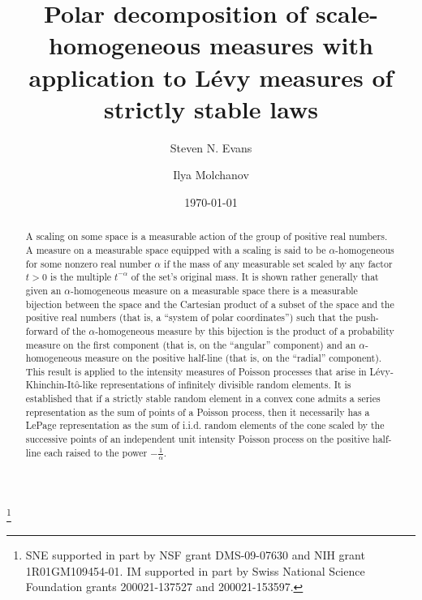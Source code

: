 \documentclass[12pt]{amsart}
\numberwithin{equation}{section}
\numberwithin{figure}{section}
\theoremstyle{plain} \newtheorem{theorem}{Theorem}[section]
\theoremstyle{plain} \newtheorem{proposition}[theorem]{Proposition}
\theoremstyle{plain} \newtheorem{lemma}[theorem]{Lemma}
\theoremstyle{plain} \newtheorem{corollary}[theorem]{Corollary}
\theoremstyle{definition} \newtheorem{definition}[theorem]{Definition}
\theoremstyle{definition} \newtheorem{notation}[theorem]{Notation}
\theoremstyle{remark} \newtheorem{remark}[theorem]{Remark}
\theoremstyle{remark} \newtheorem{example}[theorem]{Example}
\theoremstyle{definition} \newtheorem{assumption}{Assumption}
\begin{document}
\title[Polar decomposition of scale-homogeneous measures]{Polar decomposition of
  scale-homogeneous measures with application to L\'evy measures of strictly
  stable laws}

\author[S.N. Evans]{Steven N. Evans}
\address{Department of Statistics \#3860\\
 367 Evans Hall \\
 University of California \\
  Berkeley, CA  94720-3860 \\
   USA} 


\author[I. Molchanov]{Ilya Molchanov}
\address{University of Bern \\
 Institute of Mathematical Statistics and Actuarial Science \\
 Sidlerstrasse 5 \\
 CH-3012 Bern \\
 SWITZERLAND}

\thanks{SNE supported in part by NSF grant DMS-09-07630 and NIH grant
  1R01GM109454-01. IM supported in part by Swiss National Science
  Foundation grants 200021-137527 and 200021-153597.}



\date{\today}

\begin{abstract}
  A scaling on some space is a measurable action of the group of
  positive real numbers.  A measure on a measurable space equipped
  with a scaling is said to be $\alpha$-homogeneous for some nonzero
  real number $\alpha$ if the mass of any measurable set scaled by any
  factor $t > 0$ is the multiple $t^{-\alpha}$ of the set's original
  mass.  It is shown rather generally that given an
  $\alpha$-homogeneous measure on a measurable space there is a
  measurable bijection between the space and the Cartesian product of
  a subset of the space and the positive real numbers (that is, a
  ``system of polar coordinates'') such that the push-forward of the
  $\alpha$-homogeneous measure by this bijection is the product of a
  probability measure on the first component (that is, on the
  ``angular'' component) and an $\alpha$-homogeneous measure on the
  positive half-line (that is, on the ``radial'' component). This
  result is applied to the intensity measures of Poisson processes
  that arise in L\'evy-Khinchin-It\^o-like representations of
  infinitely divisible random elements. It is established that if a
  strictly stable random element in a convex cone admits a series
  representation as the sum of points of a Poisson process, then it
  necessarily has a LePage representation as the sum of i.i.d. random
  elements of the cone scaled by the successive points of an
  independent unit intensity Poisson process on the positive half-line
  each raised to the power $-\frac{1}{\alpha}$.
\end{abstract}
\end{document}
